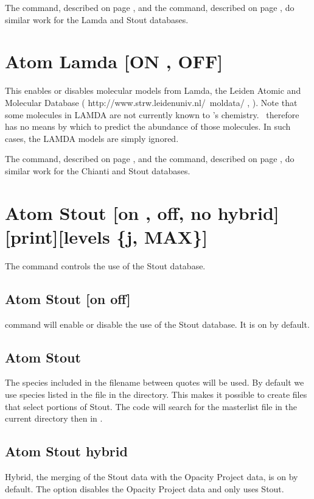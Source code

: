The  command, described on page \pageref{sec:SetLamda},
and the  command, described on page \pageref{sec:SetStout},
do similar work for the Lamda and Stout databases.

\section{Atom Lamda [ON , OFF]}
\label{sec:SetLamda}
This enables or disables molecular models from Lamda, the Leiden Atomic and Molecular
Database ( http://www.strw.leidenuniv.nl/~moldata/ , 
\citet{Schoier.F05An-atomic-and-molecular-database-for-analysis}).   
Note that some molecules in LAMDA are not
currently known to \Cloudy 's chemistry.  \Cloudy\ therefore has no means by
which to predict the abundance of those molecules.  In such cases, the
LAMDA models are simply ignored. 

The  command, described on page \pageref{sec:SetChianti},
and the  command, described on page \pageref{sec:SetStout},
do similar work for the Chianti and Stout databases.


\section{Atom Stout [on , off, no hybrid][print][levels \{j, MAX\}]}
\label{sec:SetStout}
The command controls the use of the Stout database.

\subsection{Atom Stout [on off]} 
command will enable or disable the use of the Stout database.
It is on by default.

\subsection{Atom Stout }
The species included in the filename between quotes will be used.
By default we use species listed in the  file in the 
 directory.
This makes it possible to create  files that select portions of Stout.
The code will search for the masterlist file in the current directory then in
.

\subsection{Atom Stout hybrid} 
Hybrid, the merging of the Stout data with the Opacity Project data, 
is on by default.
The  option disables the Opacity Project data 
and only uses Stout.

